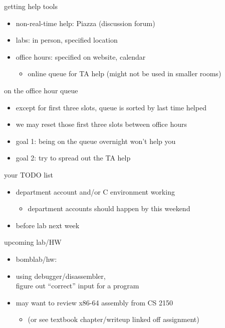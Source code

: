 \begin{frame}{getting help tools}
    \begin{itemize}
    \item non-real-time help: Piazza (discussion forum)
    \item labs: in person, specified location
    \item office hours: specified on website, calendar
        \begin{itemize}
        \item online queue for TA help (might not be used in smaller rooms)
        \end{itemize}
    \end{itemize}
\end{frame}

\begin{frame}{on the office hour queue}
    \begin{itemize}
    \item except for first three slots, queue is sorted by last time helped
    \item we may reset those first three slots between office hours
    \vspace{.5cm}
    \item goal 1: being on the queue overnight won't help you
    \item goal 2: try to spread out the TA help
    \end{itemize}
\end{frame}

\begin{frame}{your TODO list}
    \begin{itemize}
    \item department account and/or C environment working
        \begin{itemize}
        \item department accounts should happen by this weekend
        \end{itemize}
    \item before lab next week
    \end{itemize}
\end{frame}

\begin{frame}{upcoming lab/HW}
    \begin{itemize}
    \item bomblab/hw:
    \item using debugger/disassembler, \\ figure out ``correct'' input for a program
    \item may want to review x86-64 assembly from CS 2150
        \begin{itemize}
        \item (or see textbook chapter/writeup linked off assignment)
        \end{itemize}
    \end{itemize}
\end{frame}

